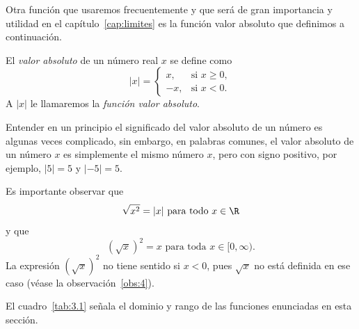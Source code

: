 \documentclass[12pt,a4paper]{book}
\begin{document}
    Otra función que usaremos frecuentemente y que será de gran importancia
    y utilidad en el capítulo~\ref{cap:limites} es la función valor absoluto que definimos a
    continuación.

    \begin{definicion}\label{def:19}
        El \textit{valor absoluto} de un número
        real $x$ se define como
        \begin{equation*}
            |x|=\begin{cases}
                x, & \text{si }x\geq 0,\\
                -x, & \text{si }x<0.
            \end{cases}
        \end{equation*}
        A $|x|$ le llamaremos la \textit{función valor absoluto}.
    \end{definicion}

    Entender en un principio el significado del valor absoluto de un número es
    algunas veces complicado, sin embargo, en palabras comunes, el valor absoluto
    de un número $x$ es simplemente el mismo número $x$, pero con signo positivo,
    por ejemplo, $|5|=5$ y $|-5|=5$.

    Es importante observar que
    \begin{equation*}
        \sqrt{x^{2}}=|x|\ \text{para todo }x\in\R
    \end{equation*}
    y que
    \begin{equation*}
        \left(\sqrt{x}\right)^{2}=x\text{ para toda }x\in[0,\infty).
    \end{equation*}
    La expresión $\left(\sqrt{x}\right)^{2}$ no tiene sentido si $x<0$, pues $\sqrt{x}$ no está definida en
    ese caso (véase la observación~\ref{obs:4}).

    El cuadro~\ref{tab:3.1} señala el dominio y rango de las funciones enunciadas en
    esta sección.
\end{document}
